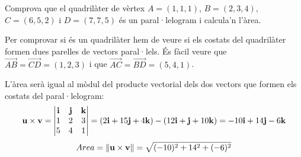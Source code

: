 \Exercise Comprova que el quadrilàter de vèrtex $A=(1,1,1)$, $B=(2,3,4)$, $C=(6,5,2)$ i $D=(7,7,5)$ és un paral·lelogram i calcula'n l'àrea.

\Answer Per comprovar si és un quadrilàter hem de veure si els costats del quadrilàter formen dues parelles de vectors paral·lels. És fàcil veure que $\overrightarrow{AB}=\overrightarrow{CD}=(1,2,3)$ i que $\overrightarrow{AC}=\overrightarrow{BD}=(5,4,1)$.

L'àrea serà igual al mòdul del producte vectorial dels dos vectors que formen els costats del paral·lelogram:
\[
\textbf{u} \times \textbf{v}=
\begin{vmatrix}
\textbf{i} & \textbf{j} & \textbf{k} \\
1 & 2 & 3\\
5 & 4 & 1
\end{vmatrix}=
(2\textbf{i}+15\textbf{j}+4\textbf{k})-(12\textbf{i}+\textbf{j}+10\textbf{k})=-10\textbf{i}+14\textbf{j}-6\textbf{k}
\]
\[
Area=\norm{\textbf{u} \times \textbf{v}}=\sqrt{(-10)^2+14^2+(-6)^2}
\]
\blacksquare
